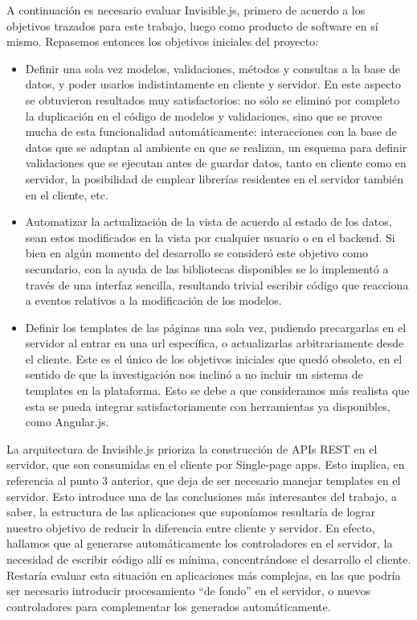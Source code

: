 \documentclass[doc,helv,longtable]{article}
\begin{document}
A continuación es necesario evaluar Invisible.js, primero de acuerdo a los objetivos trazados para este trabajo, luego como producto de software en sí mismo. Repasemos entonces los objetivos iniciales del proyecto:
\begin{itemize}
\item  Definir una sola vez modelos, validaciones, métodos y consultas a la base de datos, y poder usarlos indistintamente en cliente y servidor. En este aspecto se obtuvieron resultados muy satisfactorios: no sólo se eliminó por completo la duplicación en el código de modelos y validaciones, sino que se provee mucha de esta funcionalidad automáticamente: interacciones con la base de datos que se adaptan al ambiente en que se realizan, un esquema para definir validaciones que se ejecutan antes de guardar datos, tanto en cliente como en servidor, la posibilidad de emplear librerías residentes en el servidor también en el cliente, etc.
\item  Automatizar la actualización de la vista de acuerdo al estado de los datos, sean estos modificados en la vista por cualquier usuario o en el backend. Si bien en algún momento del desarrollo se consideró este objetivo como secundario, con la ayuda de las bibliotecas disponibles se lo implementó a través de una interfaz sencilla, resultando trivial escribir código que reacciona a eventos relativos a la modificación de los modelos.
\item  Definir los templates de las páginas una sola vez, pudiendo precargarlas en el servidor al entrar en una url específica, o actualizarlas arbitrariamente desde el cliente. Este es el único de los objetivos iniciales que quedó obsoleto, en el sentido de que la investigación nos inclinó a no incluir un sistema de templates en la plataforma. Esto se debe a que consideramos más realista que esta se pueda integrar satisfactoriamente con herramientas ya disponibles, como Angular.js. 

\end{itemize}


La arquitectura de Invisible.js prioriza la construcción de APIs REST en el servidor, que son consumidas en el cliente por Single-page apps. Esto implica, en referencia al punto 3 anterior, que deja de ser necesario manejar templates en el servidor. Esto introduce una de las conclusiones más interesantes del trabajo, a saber, la estructura de las aplicaciones que suponíamos resultaría de lograr nuestro objetivo de reducir la diferencia entre cliente y servidor. En efecto, hallamos que al generarse automáticamente los controladores en el servidor, la necesidad de escribir código allí es mínima, concentrándose el desarrollo el cliente. Restaría evaluar esta situación en aplicaciones más complejas, en las que podría ser necesario introducir procesamiento “de fondo” en el servidor, o nuevos controladores para complementar los generados automáticamente.
\end{document}
